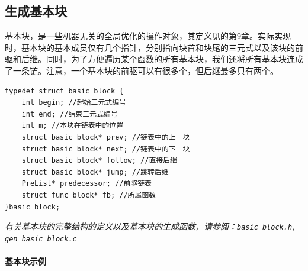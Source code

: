 \subsection{生成基本块}
\label{basicblock}
基本块，是一些机器无关的全局优化的操作对象，其定义见\cite{sunjiasu}的第9章。实际实现时，基本块的基本成员仅有几个指针，分别指向块首和块尾的三元式以及该块的前驱和后继。同时，为了方便遍历某个函数的所有基本块，我们还将所有基本块连成了一条链。注意，一个基本块的前驱可以有很多个，但后继最多只有两个。
\begin{lstlisting}
typedef struct basic_block {
	int begin; //起始三元式编号
	int end; //结束三元式编号
	int m; //本块在链表中的位置
	struct basic_block* prev; //链表中的上一块
	struct basic_block* next; //链表中的下一块
	struct basic_block* follow; //直接后继
	struct basic_block* jump; //跳转后继
	PreList* predecessor; //前驱链表
	struct func_block* fb; //所属函数
}basic_block;
\end{lstlisting}

{\it \anchor 有关基本块的完整结构的定义以及基本块的生成函数，请参阅：\verb|basic_block.h, gen_basic_block.c|}\\
\paragraph*{基本块示例}

